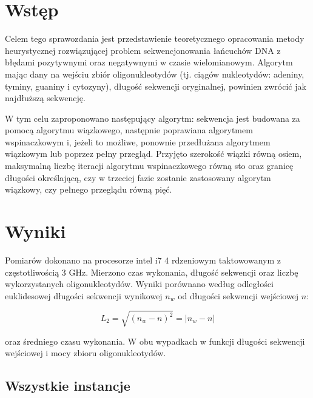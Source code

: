 \documentclass{article}
\begin{document}


\section{Wstęp}
Celem tego sprawozdania jest przedstawienie teoretycznego opracowania metody heurystycznej rozwiązującej problem sekwencjonowania łańcuchów DNA z błędami pozytywnymi oraz negatywnymi w czasie wielomianowym. Algorytm mając dany na wejściu zbiór oligonukleotydów (tj. ciągów nukleotydów: adeniny, tyminy, guaniny i cytozyny), długość sekwencji oryginalnej, powinien zwrócić jak najdłuższą sekwencję.

W tym celu zaproponowano następujący algorytm: sekwencja jest budowana za pomocą algorytmu wiązkowego, następnie poprawiana algorytmem wspinaczkowym i, jeżeli to możliwe, ponownie przedłużana algorytmem wiązkowym lub poprzez pełny przegląd. Przyjęto szerokość wiązki równą osiem, maksymalną liczbę iteracji algorytmu wspinaczkowego  równą sto oraz granicę długości określającą, czy w trzeciej fazie zostanie zastosowany algorytm wiązkowy, czy pełnego przeglądu równą pięć.
\section{Wyniki}

Pomiarów dokonano na procesorze intel i7 4 rdzeniowym taktowowanym z częstotliwością 3 GHz.
Mierzono czas wykonania, długość sekwencji oraz liczbę wykorzystanych oligonukleotydów.
Wyniki porównano według odległości euklidesowej długości sekwencji wynikowej $n_w$ od długości sekwencji wejściowej $n$:

\begin{equation}
L_2 = \sqrt{(n_w-n)^2} = |n_w-n|
\end{equation}

oraz średniego czasu wykonania.
W obu wypadkach w funkcji długości sekwencji wejściowej i mocy zbioru oligonukleotydów.

\subsection{Wszystkie instancje}
\end{document}
